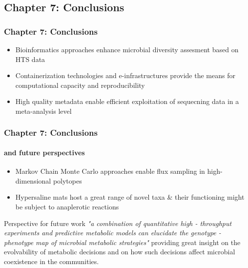 \documentclass{beamer}
\begin{document}




   \begin{darkframes}
      \section{
         \textbf{\textbf{Chapter 7: } Conclusions}
      }

   \begin{frame}
      \frametitle{\textbf{Chapter 7: } Conclusions}

      \begin{itemize}

         \item Bioinformatics approaches enhance microbial diversity assesment based on HTS data
         \bigskip
         \item Containerization technologies and e-infrastructures provide the means for computational capacity and reproducibility
         \bigskip
         \item High quality metadata enable efficient exploitation of sequecning data in a meta-analysis level
         
      \end{itemize}
   \end{frame}

   \begin{frame}
      \frametitle{\textbf{Chapter 7: } Conclusions}
      \framesubtitle{and future perspectives}
      \begin{itemize}
         \item Markov Chain Monte Carlo approaches enable flux sampling in high-dimensional polytopes 
         \bigskip
         \item Hypersaline mats host a great range of novel taxa \& their functioning might be subject to anaplerotic reactions

      \end{itemize}
      \bigskip
      \begin{block}{Perspective for future work}
         \small
         \textit{
            "a combination of quantitative high - throughput experiments and predictive metabolic
            models can elucidate the genotype - phenotype map of microbial metabolic strategies"
         }
         providing great insight on the evolvability of metabolic decisions and on how such 
         decisions affect microbial coexistence in the communities. 
         
      \end{block}

   \end{frame}
   \end{darkframes}
\end{document}
